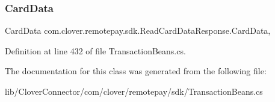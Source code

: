 \subsubsection{\texorpdfstring{Card\+Data}{CardData}}
{\footnotesize\ttfamily Card\+Data com.\+clover.\+remotepay.\+sdk.\+Read\+Card\+Data\+Response.\+Card\+Data\hspace{0.3cm}{\ttfamily [get]}, {\ttfamily [set]}}



Definition at line 432 of file Transaction\+Beans.\+cs.



The documentation for this class was generated from the following file\+:\begin{DoxyCompactItemize}
\item 
lib/\+Clover\+Connector/com/clover/remotepay/sdk/Transaction\+Beans.\+cs\end{DoxyCompactItemize}
